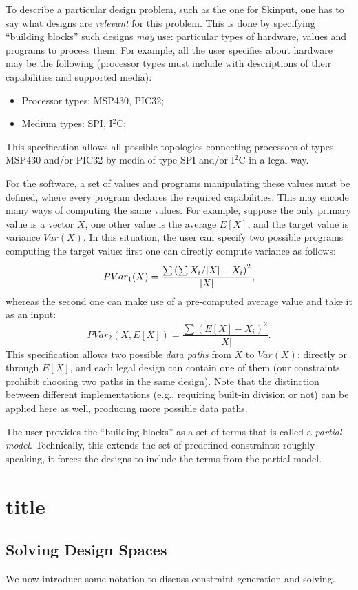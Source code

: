 \documentclass[conference]{IEEEtran}
\begin{document}
To describe a particular design problem, such as the one for Skinput, one has to say what designs are \emph{relevant} for this problem. This is done by specifying ``building blocks'' such designs \emph{may} use: particular types of hardware, values and programs to process them. For example, all the user specifies about hardware may be the following (processor types must include with descriptions of their capabilities and supported media):
\begin{itemize}
  \item Processor types: MSP430, PIC32;
  \item Medium types: SPI, I$^2$C;
\end{itemize}
This specification allows all possible topologies connecting processors of types MSP430 and/or PIC32 by media of type SPI and/or I$^2$C in a legal way.

For the software, a set of values and programs manipulating these values must be defined, where every program declares the required capabilities. This may encode many ways of computing the same values. For example, suppose the only primary value is a vector $X$, one other value is the average $E[X]$, and the target value is variance $Var(X)$. In this situation, the user can specify two possible programs computing the target value: first one can directly compute variance as follows:
$$PVar_1(X) = \frac{\sum \left( \sum X_i \middle/ |X| - X_i \right)^2}{|X|},$$
whereas the second one can make use of a pre-computed average value and take it as an input:
$$PVar_2(X, E[X]) = \frac{\sum \left( E[X] - X_i \right)^2}{|X|}.$$
This specification allows two possible \emph{data paths} from $X$ to $Var(X)$: directly or through $E[X]$, and each legal design can contain one of them (our constraints prohibit choosing two paths in the same design). Note that the distinction between different implementations (e.g., requiring built-in division or not) can be applied here as well, producing more possible data paths.

The user provides the ``building blocks'' as a set of terms that is called a \emph{partial model}. Technically, this extends the set of predefined constraints: roughly speaking, it forces the designs to include the terms from the partial model. 

\section{title}

\subsection{Solving Design Spaces}
We now introduce some notation to discuss constraint generation and solving. 
\end{document}
